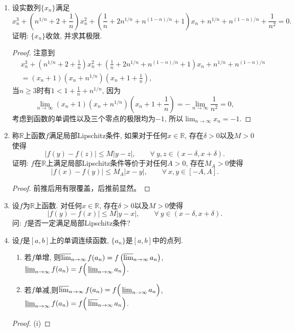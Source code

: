 \begin{2a}
\begin{enumerate}
\begin{proof}
因为\[f(x)-f\left(\frac{x}{2^{n+1}}\right)=\sum_{k=1}^{n+1}\left(f\left(\frac{x}{2^{k-1}}\right)-f\left(\frac{x}{2^k}\right)\right).\]
所以\[\left|\frac{f(x)-f(x/2^{n+1})}{x}\right|
\leqslant\sum_{k=1}^{n+1}\left|\frac{f(x/2^{k-1})-f(x/2^k)}{x}\right|
=\sum_{k=1}^{n+1}\frac{1}{2^k}\left|\frac{f(x/2^{k-1})-f(x/2^k)}{x/2^k}\right|.\]
应用最初结果, 得到\[\left|\frac{f(x)-f(x/2^{n+1})}{x}\right|
<\sum_{k=1}^{n+1}\frac{1}{2^k}\cdot 2\varepsilon
=\left(1-\frac{1}{2^{n+1}}\right)\cdot2\varepsilon<2\varepsilon.\]
在此式中令\(n\rightarrow +\infty\), 注意\(\lim_{x\rightarrow 0}f(x)=0\), 即得
\[\left|\frac{f(x)}{x}\right|\leqslant 2\varepsilon.\]
于是\(\lim_{x\rightarrow 0}\frac{f(x)}{x}=0.\)
\end{proof}
\item  设实数列\(\{x_n\}\)满足\[x_n^3+\left(n^{1/n}+2+\frac{1}{n}\right)x_n^2+\left(\frac{1}{n}+2n^{1/n}+n^{(1-n)/n}+1\right)x_n+n^{1/n}+n^{(1-n)/n}+\frac{1}{n^2}=0.\]证明: \(\{x_n\}\)收敛, 并求其极限.
\begin{proof}
注意到\[\begin{aligned}
&x_n^3+\left(n^{1/n}+2+\frac{1}{n}\right)x_n^2+\left(\frac{1}{n}+2n^{1/n}+n^{(1-n)/n}+1\right)x_n+n^{1/n}+n^{(1-n)/n}\\&=(x_n+1)(x_n+n^{1/n})(x_n+1+\frac{1}{n}),
\end{aligned}\]当\(n\geqslant 3\)时有\(1<1+\frac{1}{n}+n^{1/n}\), 因为
\[\lim_{n\rightarrow\infty}(x_n+1)(x_n+n^{1/n})(x_n+1+\frac{1}{n})=-\lim_{n\rightarrow\infty}\frac{1}{n^2}=0,\]
考虑到函数的单调性以及三个零点的极限均为\(-1\), 所以\(\lim_{n\rightarrow\infty}x_n=-1\).
\end{proof}
\item 称\(\mathbb{R}\)上函数\(f\)满足局部Lipschitz条件, 
如果对于任何\(x\in\mathbb{R}\), 存在\(\delta>0\)以及\(M>0\)使得
\[|f(y)-f(z)|\leqslant M|y-z|,\qquad\forall\ y,z\in(x-\delta,x+\delta).\]
证明: \(f\)在\(\mathbb{R}\)上满足局部Lipschitz条件等价于对任何\(A>0\), 存在\(M_A>0\)使得
\[|f(x)-f(y)|\leqslant M_A|x-y|,\qquad\forall\ x,y\in[-A,A].\]
\begin{proof}
    前推后用有限覆盖，后推前显然。
\end{proof}
\item 设\(f\)为\(\mathbb{R}\)上函数. 对任何\(x\in\mathbb{R}\), 存在\(\delta>0\)以及\(M>0\)使得
\[|f(y)-f(x)|\leqslant M|y-x|,\qquad\forall\ y\in (x-\delta,x+\delta).\]
问: \(f\)是否一定满足局部Lipschitz条件?
\item 设\(f\)是\([a,b]\)上的单调连续函数, \(\{a_n\}\)是\([a,b]\)中的点列.
\begin{enumerate}[label=(\roman*)]
    \item 若\(f\)单增, 则\(\varlimsup_{n\rightarrow\infty}f(a_n)=f\left(\varlimsup_{n\rightarrow\infty}a_n\right)\), 
    \(\varliminf_{n\rightarrow\infty}f(a_n)=f\Big(\varliminf_{n\rightarrow\infty}a_n\Big)\).
    \item 若\(f\)单减,则\(\varlimsup_{n\rightarrow\infty}f(a_n)=f\Big(\varliminf_{n\rightarrow\infty}a_n\Big)\), 
    \(\varliminf_{n\rightarrow\infty}f(a_n)=f\Big(\varlimsup_{n\rightarrow\infty}a_n\Big)\).
\end{enumerate}
\begin{proof}
	(i)
	

\end{proof}
\end{enumerate}
\end{2a}
